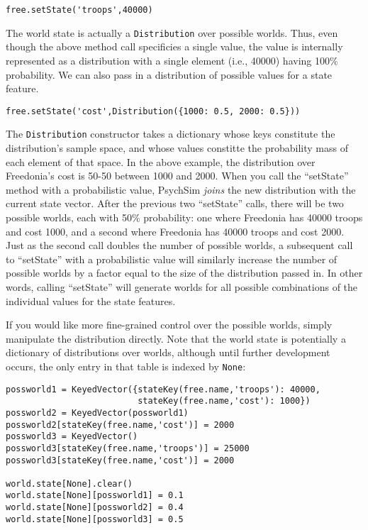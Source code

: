 \documentclass{article}
\begin{document}
\begin{verbatim}
free.setState('troops',40000)
\end{verbatim}

The world state is actually a {\tt Distribution} over possible worlds. Thus, even though the above method call specificies a single value, the value is internally represented as a distribution with a single element (i.e., 40000) having 100\% probability. We can also pass in a distribution of possible values for a state feature.

\begin{verbatim}
free.setState('cost',Distribution({1000: 0.5, 2000: 0.5}))
\end{verbatim}

The {\tt Distribution} constructor takes a dictionary whose keys constitute the distribution's sample space, and whose values constitte the probability mass of each element of that space. In the above example, the distribution over Freedonia's cost is 50-50 between 1000 and 2000. When you call the ``setState'' method with a probabilistic value, PsychSim {\em joins} the new distribution with the current state vector. After the previous two ``setState'' calls, there will be two possible worlds, each with 50\% probability: one where Freedonia has 40000 troops and cost 1000, and a second where Freedonia has 40000 troops and cost 2000. Just as the second call doubles the number of possible worlds, a subsequent call to ``setState'' with a probabilistic value will similarly increase the number of possible worlds by a factor equal to the size of the distribution passed in. In other words, calling ``setState'' will generate worlds for all possible combinations of the individual values for the state features.

If you would like more fine-grained control over the possible worlds, simply manipulate the distribution directly. Note that the world state is potentially a dictionary of distributions over worlds, although until further development occurs, the only entry in that table is indexed by {\tt None}:

\begin{verbatim}
possworld1 = KeyedVector({stateKey(free.name,'troops'): 40000, 
                          stateKey(free.name,'cost'): 1000})
possworld2 = KeyedVector(possworld1)
possworld2[stateKey(free.name,'cost')] = 2000
possworld3 = KeyedVector()
possworld3[stateKey(free.name,'troops')] = 25000
possworld3[stateKey(free.name,'cost')] = 2000

world.state[None].clear()
world.state[None][possworld1] = 0.1
world.state[None][possworld2] = 0.4
world.state[None][possworld3] = 0.5
\end{verbatim}
\end{document}
